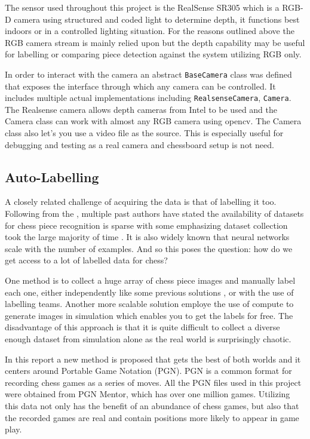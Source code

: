 The sensor used throughout this project is the RealSense SR305 which is a RGB-D camera
using structured and coded light to determine depth, it functions best indoors or in a 
controlled lighting situation.  For the reasons outlined above the RGB camera stream is 
mainly relied upon but the depth capability may be useful for labelling or comparing piece detection 
against the system utilizing RGB only.  

In order to interact with the camera an abstract \verb|BaseCamera| class was defined that 
exposes the interface through which any camera can be controlled.  It includes multiple 
actual implementations including \verb|RealsenseCamera|, \verb|Camera|.  The Realsense camera allows 
depth cameras from Intel to be used and the Camera class can work with almost any RGB camera using opencv.
The Camera class also let's you use a video file as the source.  This is especially useful for 
debugging and testing as a real camera and chessboard setup is not need.

\subsection{Auto-Labelling}
A closely related challenge of acquiring the data is that of labelling it too. 
Following from the , multiple past authors have stated the availability of 
datasets for chess piece recognition is sparse \cite{Ding2016ChessVisionC, heatmap} with some emphasizing
dataset collection took the large majority of time \cite{chessvgg}.
It is also widely known that neural networks scale with the number of examples.
And so this poses the question: how do we get access to a lot of labelled data 
for chess?

One method is to collect a huge array of chess piece images and manually label each one, either independently 
like some previous solutions \cite{Ding2016ChessVisionC}, or with the use of labelling teams.
Another more scalable solution employe the use of compute to generate images in simulation which enables you to 
get the labels for free.  The disadvantage of this approach is that it is quite difficult to collect a diverse enough 
dataset from simulation alone as the real world is surprisingly chaotic.

In this report a new method is proposed that gets the best of both worlds and it centers around 
Portable Game Notation (PGN). PGN is a common format for recording chess games as a 
series of moves.  All the PGN files used in this 
project were obtained from PGN Mentor, which has over one million games.  Utilizing this
data not only has the benefit of an abundance of chess games, but also that the 
recorded games are real and contain positions more likely to appear in game play. 

